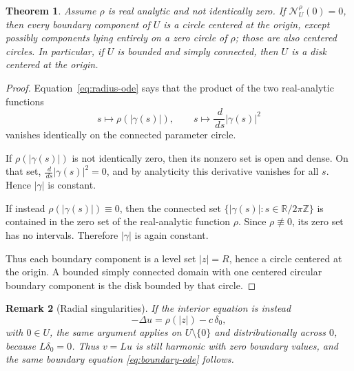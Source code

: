 \documentclass[11pt]{article}
\newtheorem{theorem}{Theorem}[section]
\newtheorem{remark}[theorem]{Remark}
\newcommand{\R}{\mathbb R}
\newcommand{\dd}{\,d}
\newcommand{\1}{\mathbf 1}
\begin{document}
\begin{theorem}\label{thm:dtn-to-circle}
Assume \(\rho\) is real analytic and not identically zero.  If
\(\mathcal N_U^\rho(0)=0\), then every boundary component of \(U\) is a circle
centered at the origin, except possibly components lying entirely on a zero
circle of \(\rho\); those are also centered circles.  In particular, if
\(U\) is bounded and simply connected, then \(U\) is a disk centered at the
origin.
\end{theorem}

\begin{proof}
Equation~\eqref{eq:radius-ode} says that the product of the two real-analytic
functions
\[
  s\mapsto \rho(|\gamma(s)|),
  \qquad
  s\mapsto \frac{\dd}{\dd s}|\gamma(s)|^2
\]
vanishes identically on the connected parameter circle.

If \(\rho(|\gamma(s)|)\) is not identically zero, then its nonzero set is open
and dense.  On that set, \(\frac{\dd}{\dd s}|\gamma(s)|^2=0\), and by analyticity
this derivative vanishes for all \(s\).  Hence \(|\gamma|\) is constant.

If instead \(\rho(|\gamma(s)|)\equiv0\), then the connected set
\(\{|\gamma(s)|:s\in\R/2\pi\mathbb Z\}\) is contained in the zero set of the
real-analytic function \(\rho\).  Since \(\rho\not\equiv0\), its zero set has no
intervals.  Therefore \(|\gamma|\) is again constant.

Thus each boundary component is a level set \(|z|=R\), hence a circle centered
at the origin.  A bounded simply connected domain with one centered circular
boundary component is the disk bounded by that circle.
\end{proof}

\begin{remark}[Radial singularities]
If the interior equation is instead
\[
  -\Delta u=\rho(|z|)-c\,\delta_0,
\]
with \(0\in U\), the same argument applies on \(U\setminus\{0\}\) and
distributionally across \(0\), because \(L\delta_0=0\).  Thus \(v=Lu\) is still
harmonic with zero boundary values, and the same boundary equation
\eqref{eq:boundary-ode} follows.
\end{remark}
\end{document}
